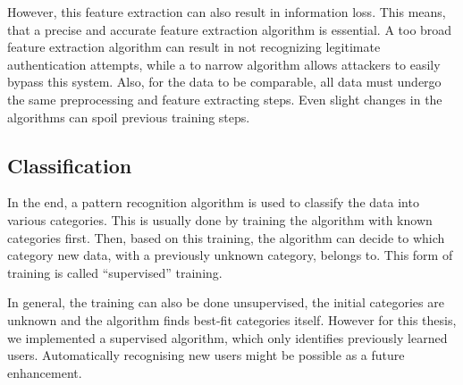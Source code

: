 However, this feature extraction can also result in information loss. This means, that a precise and accurate feature extraction algorithm is essential. A too broad feature extraction algorithm can result in not recognizing legitimate authentication attempts, while a to narrow algorithm allows attackers to easily bypass this system. Also, for the data to be comparable, all data must undergo the same preprocessing and feature extracting steps. Even slight changes in the algorithms can spoil previous training steps.

\subsection{Classification}
In the end, a pattern recognition algorithm is used to classify the data into various categories. This is usually done by training the algorithm with known categories first. Then, based on this training, the algorithm can decide to which category new data, with a previously unknown category, belongs to. This form of training is called ``supervised'' training.

In general, the training can also be done unsupervised, \ie the initial categories are unknown and the algorithm finds best-fit categories itself. However for this thesis, we implemented a supervised algorithm, which only identifies previously learned users. Automatically recognising new users might be possible as a future enhancement.